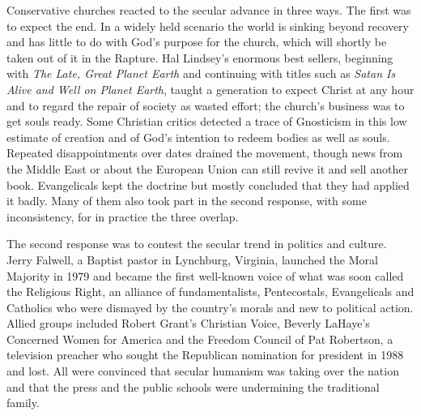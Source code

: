 Conservative churches reacted to the secular advance in three ways. The first was to expect the end.
In a widely held scenario the world is sinking beyond recovery and has little to do with God's
purpose for the church, which will shortly be taken out of it in the Rapture. Hal Lindsey's enormous best sellers, beginning with \emph{The Late, Great Planet Earth} and continuing with titles such as \emph{Satan Is Alive and Well on Planet Earth}, taught a generation to expect Christ at any hour and to regard the repair of society as
wasted effort; the church's business was to get souls ready. Some Christian critics detected a trace
of Gnosticism in this low estimate of creation and of God's intention to redeem bodies as well as
souls. Repeated disappointments over dates drained the movement, though news from the Middle East or
about the European Union can still revive it and sell another book. Evangelicals kept the doctrine
but mostly concluded that they had applied it badly. Many of them also took part in the second
response, with some inconsistency, for in practice the three overlap.

The second response was to contest the secular trend in politics and culture. Jerry Falwell, a
Baptist pastor in Lynchburg, Virginia, launched the Moral Majority in 1979 and became the first
well-known voice of what was soon called the Religious Right, an alliance of fundamentalists,
Pentecostals, Evangelicals and Catholics who were dismayed by the country's morals and new to
political action. Allied groups included Robert Grant's Christian Voice, Beverly LaHaye's Concerned
Women for America and the Freedom Council of Pat Robertson, a television preacher who sought the
Republican nomination for president in 1988 and lost. All were convinced that secular humanism was
taking over the nation and that the press and the public schools were undermining the traditional
family.

